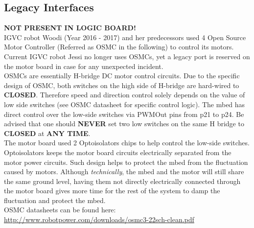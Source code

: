 \documentclass[letterpaper, 12pt]{article}
\begin{document}
\subsection{Legacy Interfaces}
\textbf{NOT PRESENT IN LOGIC BOARD!}\\
IGVC robot Woodi (Year 2016 - 2017) and her predecessors used 4 Open Source Motor Controller (Referred as OSMC in the following) to control its motors. Current IGVC robot Jessi no longer uses OSMCs, yet a legacy port is reserved on the motor board in case for any unexpected incident. \vspace{6pt}\\
OSMCs are essentially H-bridge DC motor control circuits. Due to the specific design of OSMC, both switches on the high side of H-bridge are hard-wired to \textbf{CLOSED}. Therefore speed and direction control solely depends on the value of low side switches (see OSMC datasheet for specific control logic). The mbed has direct control over the low-side switches via PWMOut pins from p21 to p24. Be advised that one should \textbf{NEVER} set two low switches on the same H bridge to \textbf{CLOSED} at \textbf{ANY TIME}. \vspace{6pt}\\
The motor board used 2 Optoisolators chips to help control the low-side switches. Optoisolators keeps the motor board circuits electrically separated from the motor power circuits. Such design helps to protect the mbed from the fluctuation caused by motors. Although \emph{technically}, the mbed and the motor will still share the same ground level, having them not directly electrically connected through the motor board gives more time for the rest of the system to damp the fluctuation and protect the mbed. \vspace{6pt}\\
OSMC datasheets can be found here:\\
\url{http://www.robotpower.com/downloads/osmc3-22sch-clean.pdf}\\
\end{document}
